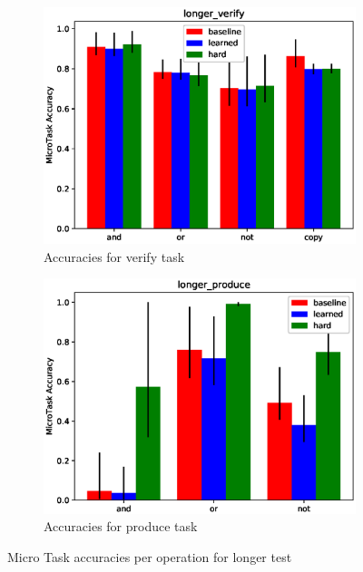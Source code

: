 \begin{figure}[ht] 
	\begin{subfigure}[b]{0.5\linewidth}
		\centering
		\includegraphics[width=0.95\linewidth]{./figs/micro/longer_verify}
		\caption{Accuracies for verify task } 
		\label{mtl1} 
		\vspace{2ex}
	\end{subfigure}%
	\begin{subfigure}[b]{0.5\linewidth}
		\centering
		\includegraphics[width=0.95\linewidth]{./figs/micro/longer_produce}
		\caption{Accuracies for produce task } 
		\label{mtl2} 
		\vspace{2ex}
	\end{subfigure}
	\caption{Micro Task accuracies per operation for longer test }
	\label{mtl}
\end{figure}

